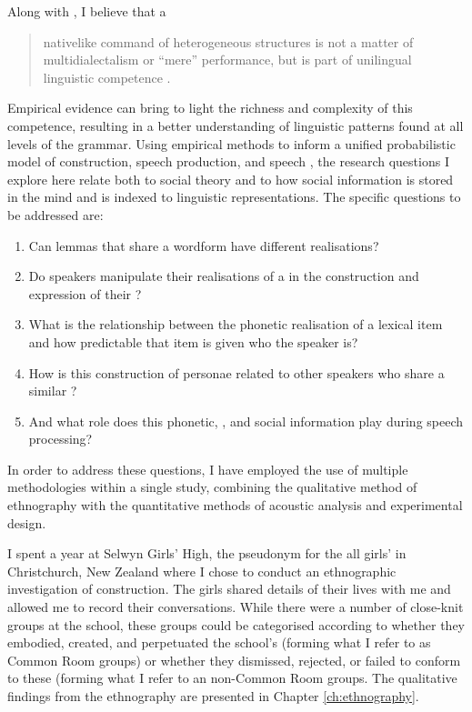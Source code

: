 Along with , I believe that a

\begin{quote}
	nativelike command of heterogeneous structures is not a matter of multidialectalism or ``mere'' performance, but is part of unilingual linguistic competence \cite[101]{weinrichlabovherzog1968}.
\end{quote}

\noindent Empirical evidence can bring to light the richness and complexity of this competence, resulting in a better understanding of linguistic patterns found at all levels of the grammar.  Using empirical methods to inform a unified probabilistic model of  construction, speech production, and speech , the research questions I explore here relate both to social theory and to how social information is stored in the mind and is indexed to linguistic representations.  The specific questions to be addressed are:

\begin{enumerate}
	\item Can lemmas that share a wordform have different realisations? 
	\item Do speakers manipulate their realisations of a  in the construction and expression of their ?  
	\item What is the relationship between the phonetic realisation of a lexical item and how predictable that item is given who the speaker is?
	\item How is this construction of personae related to other speakers who share a similar ?
	\item And what role does this phonetic, , and social information play during speech processing?   
\end{enumerate}

\noindent In order to address these questions, I have employed the use of multiple methodologies within a single study, combining the qualitative method of ethnography with the quantitative methods of acoustic analysis and experimental design. 

I spent a year at Selwyn Girls' High, the pseudonym for the all girls'  in Christchurch, New Zealand where I chose to conduct an ethnographic investigation of  construction.  The girls shared details of their lives with me and allowed me to record their conversations.  While there were a number of close-knit groups at the school, these groups could be categorised according to whether they embodied, created, and perpetuated the school's  (forming what I refer to as Common Room groups) or whether they dismissed, rejected, or failed to conform to these  (forming what I refer to an non-Common Room groups.  The qualitative findings from the ethnography are presented in Chapter \ref{ch:ethnography}.


